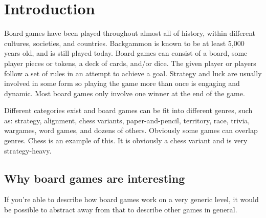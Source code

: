 \chapter{Introduction}
\label{chap:introduction}

Board games have been played throughout almost all of history, within different cultures, societies, and countries. Backgammon is known to be at least 5,000 years old, and is still played today. Board games can consist of a board, some player pieces or tokens, a  deck of cards, and/or dice. The given player or players follow a set of rules in an attempt to achieve a goal. Strategy and luck are usually involved in some form so playing the game more than once is engaging and dynamic. Most board games only involve one winner at the end of the game.

Different categories exist and board games can be fit into different genres, such as: strategy, alignment, chess variants, paper-and-pencil, territory, race, trivia, wargames, word games, and dozens of others. Obviously some games can overlap genres. Chess is an example of this. It is obviously a chess variant and is very strategy-heavy.

\section{Why board games are interesting}
If you're able to describe how board games work on a very generic level, it would be possible to abstract away from that to describe other games in general.

